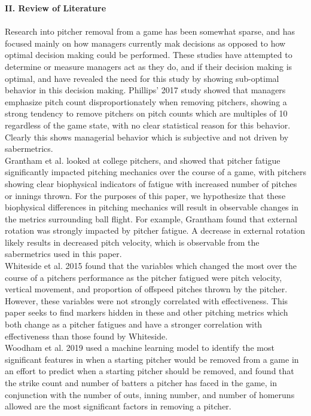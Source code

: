 \documentclass[12 pt]{article}
\begin{document}
\textbf{II. Review of Literature} \\ \\ 
\indent Research into pitcher removal from a game has been somewhat sparse, and has 
focused mainly on how managers currently mak decisions as opposed to how optimal 
decision making could be performed. These studies have attempted to determine or measure 
managers act as they do, and if their decision making is optimal, and have revealed the
need for this study by showing sub-optimal behavior in this decision making. Phillips' 2017 
study showed that managers emphasize pitch count disproportionately when removing pitchers, 
showing a strong tendency to remove pitchers on pitch counts which are multiples of 
10 regardless of the game state, with no clear statistical reason for this behavior. 
Clearly this shows managerial behavior which is subjective and not driven by sabermetrics. 
\\ \indent Grantham et al. looked at college pitchers, and showed that pitcher fatigue 
significantly impacted pitching mechanics over the course of a game, with pitchers showing 
clear biophysical indicators of fatigue with increased number of pitches or innings thrown. 
For the purposes of this paper, we hypothesize that these biophysical differences in pitching mechanics
will result in observable changes in the metrics surrounding ball flight. For example, Grantham found that external rotation 
was strongly impacted by pitcher fatigue. A decrease in external rotation likely results in 
decreased pitch velocity, which is observable from the sabermetrics used in this paper.
\\ \indent Whiteside et al. 2015 found that the variables which changed the most 
over the course of a pitchers performance as the pitcher fatigued were pitch 
velocity, vertical movement, and proportion of offspeed pitches thrown by the pitcher. However, 
these variables were not strongly correlated with effectiveness. This paper seeks to find markers 
hidden in these and other pitching metrics which both change as a pitcher fatigues and 
have a stronger correlation with effectiveness than those found by Whiteside.
\\ \indent Woodham et al. 2019 used a machine learning model to identify the most 
significant features in when a starting pitcher would be removed from a game in an effort 
to predict when a starting pitcher should be removed, and found that the strike count 
and number of batters a pitcher has faced in the game, in conjunction with the number of outs, 
inning number, and number of homeruns allowed are the most significant factors in removing a pitcher. 
\end{document}
